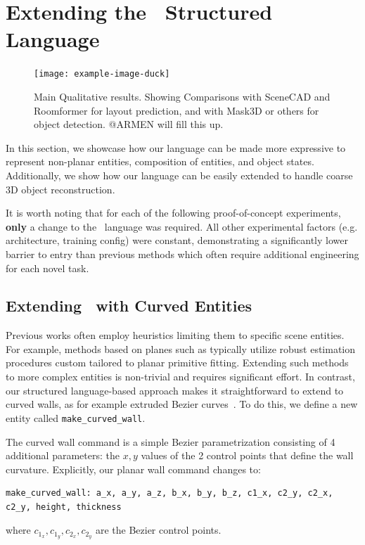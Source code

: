 \section{Extending the \METHOD~Structured Language}
\label{section:extendability}



\begin{figure}[t]
    \centering
    \texttt{[image: example-image-duck]}
    \caption{Main Qualitative results. Showing Comparisons with SceneCAD and Roomformer for layout prediction, and with Mask3D or others for object detection. @ARMEN will fill this up.}
    \label{fig:enter-label}
\end{figure}

In this section, we showcase how our language can be made more expressive to represent non-planar entities, composition of entities, and object states. Additionally, we show how our language can be easily extended to handle coarse 3D object reconstruction.

It is worth noting that for each of the following proof-of-concept experiments, \textbf{only} a change to the \METHOD~language was required. All other experimental factors (e.g. architecture, training config) were constant, demonstrating a significantly lower barrier to entry than previous methods which often require additional engineering for each novel task.

\subsection{Extending \METHOD~with Curved Entities}

Previous works often employ heuristics
limiting them to specific scene entities.
For example,
methods based on planes such as \cite{furukawa2009reconstructing,liu2019planercnn}
typically utilize robust estimation procedures custom tailored to planar primitive fitting.
Extending such methods to more complex entities is non-trivial and requires significant effort.
In contrast,
our structured language-based approach makes it straightforward to extend to curved walls,
as for example extruded Bezier curves~\cite{beziercurves}.
To do this,
we define a new entity called \texttt{make\_curved\_wall}. 

The curved wall command is a simple Bezier parametrization
consisting of 4 additional parameters:
the $x,y$ values of the 2 control points
that define the wall curvature.
Explicitly, our planar wall command changes to: 
\begin{lstlisting}[language=StructuredLanguage]
make_curved_wall: a_x, a_y, a_z, b_x, b_y, b_z, c1_x, c2_y, c2_x, c2_y, height, thickness
\end{lstlisting}
where $c_{1_x}, c_{1_y}, c_{2_x}, c_{2_y}$ are the Bezier control points. 


